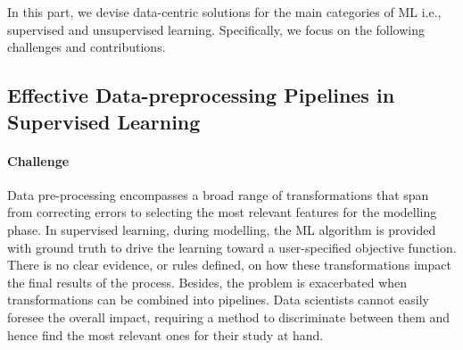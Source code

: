 In this part, we devise data-centric solutions for the main categories of ML i.e., supervised and unsupervised learning.
Specifically, we focus on the following challenges and contributions.


\subsection*{Effective Data-preprocessing Pipelines in Supervised Learning}

\paragraph{Challenge} Data pre-processing
encompasses a broad range of transformations that span from correcting errors to selecting the most relevant features for the modelling phase.
In supervised learning, during modelling, the ML algorithm is provided with ground truth to drive the learning toward a user-specified objective function.
There is no clear evidence, or rules defined, on how these transformations impact the final results of the process.
Besides, the problem is exacerbated when transformations can be combined into pipelines.
Data scientists cannot easily foresee the overall impact, requiring a method to discriminate between them and hence find the most relevant ones for their study at hand.

